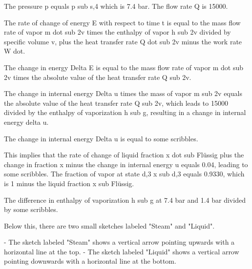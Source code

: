 The pressure p equals p sub s,4 which is 7.4 bar. The flow rate Q is 15000.

The rate of change of energy E with respect to time t is equal to the mass flow rate of vapor m dot sub 2v times the enthalpy of vapor h sub 2v divided by specific volume v, plus the heat transfer rate Q dot sub 2v minus the work rate W dot.

The change in energy Delta E is equal to the mass flow rate of vapor m dot sub 2v times the absolute value of the heat transfer rate Q sub 2v.

The change in internal energy Delta u times the mass of vapor m sub 2v equals the absolute value of the heat transfer rate Q sub 2v, which leads to 15000 divided by the enthalpy of vaporization h sub g, resulting in a change in internal energy delta u.

The change in internal energy Delta u is equal to some scribbles.

This implies that the rate of change of liquid fraction x dot sub Flüssig plus the change in fraction x minus the change in internal energy u equals 0.04, leading to some scribbles. The fraction of vapor at state d,3 x sub d,3 equals 0.9330, which is 1 minus the liquid fraction x sub Flüssig.

The difference in enthalpy of vaporization h sub g at 7.4 bar and 1.4 bar divided by some scribbles.

Below this, there are two small sketches labeled "Steam" and "Liquid".

- The sketch labeled "Steam" shows a vertical arrow pointing upwards with a horizontal line at the top.
- The sketch labeled "Liquid" shows a vertical arrow pointing downwards with a horizontal line at the bottom.